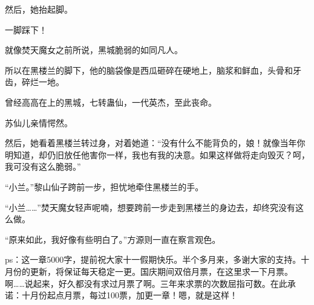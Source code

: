 \begin{this_body}
然后，她抬起脚。

一脚踩下！

就像焚天魔女之前所说，黑城脆弱的如同凡人。

所以在黑楼兰的脚下，他的脑袋像是西瓜砸碎在硬地上，脑浆和鲜血，头骨和牙齿，碎烂一地。

曾经高高在上的黑城，七转蛊仙，一代英杰，至此丧命。

苏仙儿亲情愕然。

然后，她看着黑楼兰转过身，对着她道：“没有什么不能背负的，娘！就像当年你明知道，却仍旧放任他害你一样，我也有我的决意。如果这样做将走向毁灭？呵，我可没有这么脆弱。”

“小兰。”黎山仙子跨前一步，担忧地牵住黑楼兰的手。

“小兰……”焚天魔女轻声呢喃，想要跨前一步走到黑楼兰的身边去，却终究没有这么做。

“原来如此，我好像有些明白了。”方源则一直在察言观色。

ps：这一章5000字，提前祝大家十一假期快乐。半个多月来，多谢大家的支持。十月份的更新，将保证每天稳定一更。国庆期间双倍月票，在这里求一下月票。啊……说起来，好久都没有求过月票了啊。三年来求票的次数屈指可数。在此承诺：十月份起点月票，每过100票，加更一章！嗯，就是这样！

\end{this_body}

